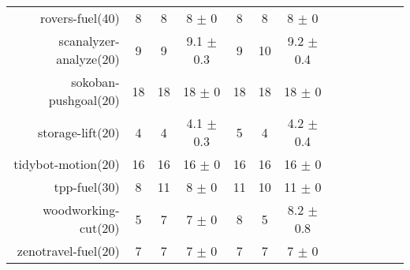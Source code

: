 \begin{center}
\begin{tabular}{|r|*{4}{ccc|}}
rovers-fuel(40) & 8 & 8 & 8 \(\pm\) 0 & 8 & 8 & 8 \(\pm\) 0\\
scanalyzer-analyze(20) & 9 & 9 & 9.1 \(\pm\) 0.3 & 9 & 10 & 9.2 \(\pm\) 0.4\\
sokoban-pushgoal(20) & 18 & 18 & 18 \(\pm\) 0 & 18 & 18 & 18 \(\pm\) 0\\
storage-lift(20) & 4 & 4 & 4.1 \(\pm\) 0.3 & 5 & 4 & 4.2 \(\pm\) 0.4\\
tidybot-motion(20) & 16 & 16 & 16 \(\pm\) 0 & 16 & 16 & 16 \(\pm\) 0\\
tpp-fuel(30) & 8 & 11 & 8 \(\pm\) 0 & 11 & 10 & 11 \(\pm\) 0\\
woodworking-cut(20) & 5 & 7 & 7 \(\pm\) 0 & 8 & 5 & 8.2 \(\pm\) 0.8\\
zenotravel-fuel(20) & 7 & 7 & 7 \(\pm\) 0 & 7 & 7 & 7 \(\pm\) 0\\
\end{tabular}
\end{center}

